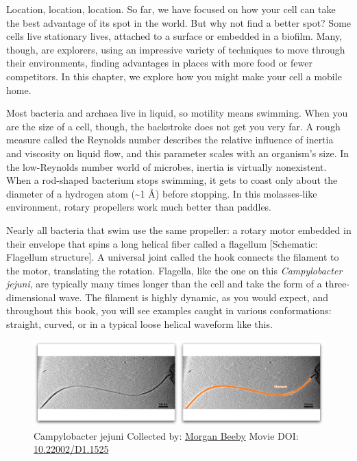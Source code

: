 \documentclass[]{tufte-book}
\begin{document}
Location, location, location. So far, we have focused on how your cell
can take the best advantage of its spot in the world. But why not find a
better spot? Some cells live stationary lives, attached to a surface or
embedded in a biofilm. Many, though, are explorers, using an impressive
variety of techniques to move through their environments, finding
advantages in places with more food or fewer competitors. In this
chapter, we explore how you might make your cell a mobile home.

Most bacteria and archaea live in liquid, so motility means swimming.
When you are the size of a cell, though, the backstroke does not get you
very far. A rough measure called the Reynolds number describes the
relative influence of inertia and viscosity on liquid flow, and this
parameter scales with an organism's size. In the low-Reynolds number
world of microbes, inertia is virtually nonexistent. When a rod-shaped
bacterium stops swimming, it gets to coast only about the diameter of a
hydrogen atom (\textasciitilde{}1 Å) before stopping. In this
molasses-like environment, rotary propellers work much better than
paddles.

Nearly all bacteria that swim use the same propeller: a rotary motor
embedded in their envelope that spins a long helical fiber called a
flagellum {[}Schematic: Flagellum structure{]}. A universal joint called
the hook connects the filament to the motor, translating the rotation.
Flagella, like the one on this \emph{Campylobacter jejuni}, are
typically many times longer than the cell and take the form of a
three-dimensional wave. The filament is highly dynamic, as you would
expect, and throughout this book, you will see examples caught in
various conformations: straight, curved, or in a typical loose helical
waveform like this.





\begin{figure}
\includegraphics{movie_stills/6_1} \caption[Campylobacter jejuni Collected by:
\protect\hyperlink{morgan_beeby}{Morgan Beeby} Movie DOI:
\href{https://doi.org/10.22002/D1.1525}{10.22002/D1.1525}]{Campylobacter jejuni Collected by:
\protect\hyperlink{morgan_beeby}{Morgan Beeby} Movie DOI:
\href{https://doi.org/10.22002/D1.1525}{10.22002/D1.1525}}\label{fig:6-1}
\end{figure}
\end{document}
